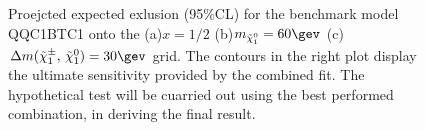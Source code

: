 \begin{figure}[h]
  \centering
    \caption{Proejcted expected exlusion (95$\%$CL) for the benchmark model QQC1BTC1 onto the (a)$x=1/2$ (b)$\mLSP=60\gev$ (c) $\dmc=30\gev$ grid. The contours in the right plot display the ultimate sensitivity provided by the combined fit. The hypothetical test will be cuarried out using the best performed combination, in deriving the final result. }
    \label{fig::SRdefinition::expLimitQQC1BTC1}
\end{figure}

